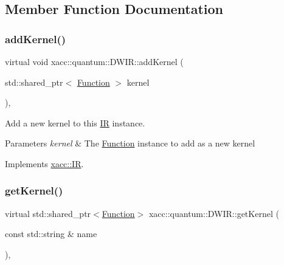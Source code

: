 \subsection{Member Function Documentation}
\mbox{\label{a01217_af1bef18e1e9568d1313b03149aab8c1b}} 
\subsubsection{\texorpdfstring{add\+Kernel()}{addKernel()}}
{\footnotesize\ttfamily virtual void xacc\+::quantum\+::\+D\+W\+I\+R\+::add\+Kernel (\begin{DoxyParamCaption}\item[{std\+::shared\+\_\+ptr$<$ \hyperlink{a01653}{Function} $>$}]{kernel }\end{DoxyParamCaption})\hspace{0.3cm}{\ttfamily [inline]}, {\ttfamily [virtual]}}

Add a new kernel to this \hyperlink{a01677}{IR} instance.


\begin{DoxyParams}{Parameters}
{\em kernel} & The \hyperlink{a01653}{Function} instance to add as a new kernel \\
\hline
\end{DoxyParams}


Implements \hyperlink{a01677_abbbf8e6993c518597de32cd05d49d737}{xacc\+::\+IR}.

\mbox{\label{a01217_a38d8bdd24250749bc38ad31f8512fcfc}} 
\subsubsection{\texorpdfstring{get\+Kernel()}{getKernel()}}
{\footnotesize\ttfamily virtual std\+::shared\+\_\+ptr$<$\hyperlink{a01653}{Function}$>$ xacc\+::quantum\+::\+D\+W\+I\+R\+::get\+Kernel (\begin{DoxyParamCaption}\item[{const std\+::string \&}]{name }\end{DoxyParamCaption})\hspace{0.3cm}{\ttfamily [inline]}, {\ttfamily [virtual]}}

